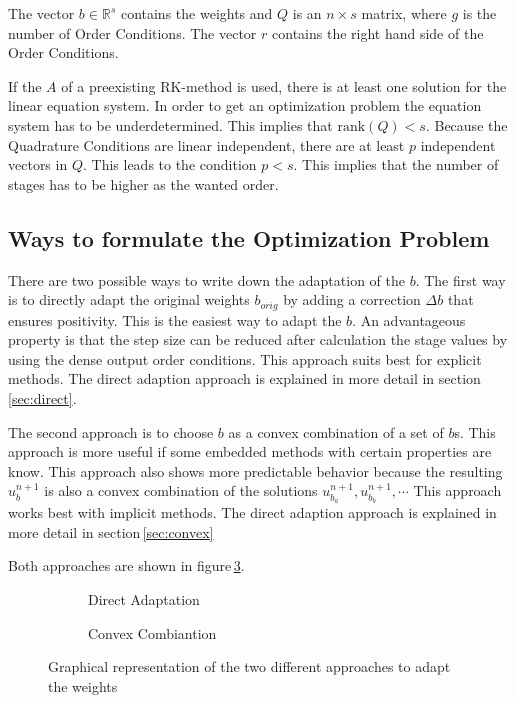 \documentclass{article}
\begin{document}
The vector $b \in \mathbb{R}^s$ contains the weights and $Q$ is an $n \times s$ matrix, where $g$ is the number of Order Conditions. The vector $r$ contains the right hand side of the Order Conditions.

If the $A$ of a  preexisting RK-method is used, there is at least one solution for the linear equation system.
In order to get an optimization problem the equation system has to be underdetermined.
This implies that $\mathrm{rank}(Q) < s$. 
Because the Quadrature Conditions are linear independent, there are at least $p$ independent vectors in $Q$. This leads to the condition $p < s$.
This implies that the number of stages has to be higher as the wanted order.


\subsection{Ways to formulate the Optimization Problem}

There are two possible ways to write down the adaptation of the $b$. The first way is to directly adapt the original weights $b_{orig}$ by adding a correction $\Delta b$ that ensures positivity.
This is the easiest way to adapt the $b$. An advantageous property is that the step size can be reduced after calculation the stage values by using the dense output order conditions.  
This approach suits best for explicit methods.
The direct adaption approach is explained in more detail in section\,\ref{sec:direct}.

The second approach is to choose $b$ as a convex combination of a set of $b$s. This approach is more useful if some embedded methods with certain properties are know. 
This approach also shows more  predictable behavior because the resulting $u^{n+1}_b$ is also a convex combination of the solutions $u^{n+1}_{b_a},u^{n+1}_{b_b},\cdots$ 
This approach works best with implicit methods.
The direct adaption approach is explained in more detail in section\,\ref{sec:convex}

Both approaches are shown in figure\,\ref{fig:b_space}.


\begin{figure}
    \centering
    \begin{subfigure}[b]{0.45\textwidth}
        
        \caption{Direct Adaptation}
        \label{fig:b_direct}
    \end{subfigure}
    \begin{subfigure}[b]{0.45\textwidth}
        
        \caption{Convex Combiantion}
        \label{fig:b_convex}
    \end{subfigure}
    \caption{Graphical representation of the two different approaches to adapt the weights}\label{fig:b_space}
\end{figure}
\end{document}
